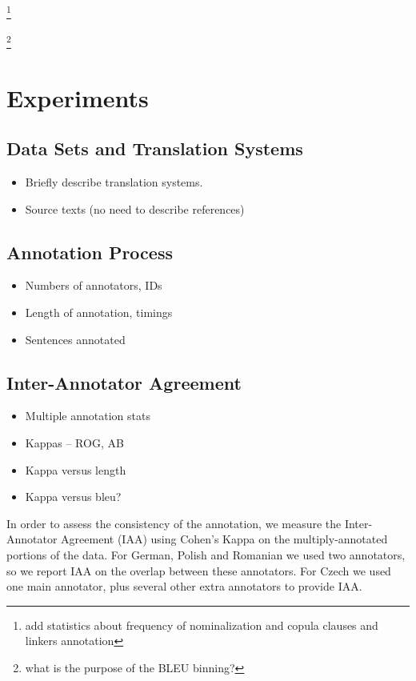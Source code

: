 \documentclass[11pt]{article}
\newcommand{\oa}[1]{\footnote{\color{red} #1}}
\begin{document}
\oa{add statistics about frequency of nominalization and copula clauses and linkers annotation}

\oa{what is the purpose of the BLEU binning?}



\section{Experiments}\label{sec:experiments}
\subsection{Data Sets and Translation Systems}
\begin{itemize}
  \item Briefly describe translation systems.
  \item Source texts (no need to describe references)
\end{itemize}

\subsection{Annotation Process}
\begin{itemize}
  \item Numbers of annotators, IDs
  \item Length of annotation, timings
  \item Sentences annotated
\end{itemize}

\subsection{Inter-Annotator Agreement}
\begin{itemize}
  \item Multiple annotation stats
  \item Kappas -- ROG, AB
  \item Kappa versus length
  \item Kappa versus bleu?
\end{itemize}

In order to assess the consistency of the annotation, we measure the Inter-Annotator
Agreement (IAA) using Cohen's Kappa on the multiply-annotated portions of the data.
For German, Polish and Romanian we used two annotators, so we report IAA on the overlap
between these annotators. For Czech we used one main annotator, plus several other extra
annotators to provide IAA. 
\end{document}
